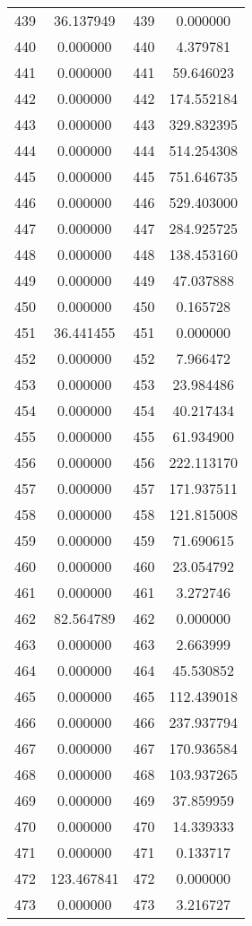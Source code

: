 \documentclass[12pt]{article}
\begin{document}
\begin{longtable}{@{}cccc@{}}
439 & 36.137949 & 439 & 0.000000 \\
440 & 0.000000 & 440 & 4.379781 \\
441 & 0.000000 & 441 & 59.646023 \\
442 & 0.000000 & 442 & 174.552184 \\
443 & 0.000000 & 443 & 329.832395 \\
444 & 0.000000 & 444 & 514.254308 \\
445 & 0.000000 & 445 & 751.646735 \\
446 & 0.000000 & 446 & 529.403000 \\
447 & 0.000000 & 447 & 284.925725 \\
448 & 0.000000 & 448 & 138.453160 \\
449 & 0.000000 & 449 & 47.037888 \\
450 & 0.000000 & 450 & 0.165728 \\
451 & 36.441455 & 451 & 0.000000 \\
452 & 0.000000 & 452 & 7.966472 \\
453 & 0.000000 & 453 & 23.984486 \\
454 & 0.000000 & 454 & 40.217434 \\
455 & 0.000000 & 455 & 61.934900 \\
456 & 0.000000 & 456 & 222.113170 \\
457 & 0.000000 & 457 & 171.937511 \\
458 & 0.000000 & 458 & 121.815008 \\
459 & 0.000000 & 459 & 71.690615 \\
460 & 0.000000 & 460 & 23.054792 \\
461 & 0.000000 & 461 & 3.272746 \\
462 & 82.564789 & 462 & 0.000000 \\
463 & 0.000000 & 463 & 2.663999 \\
464 & 0.000000 & 464 & 45.530852 \\
465 & 0.000000 & 465 & 112.439018 \\
466 & 0.000000 & 466 & 237.937794 \\
467 & 0.000000 & 467 & 170.936584 \\
468 & 0.000000 & 468 & 103.937265 \\
469 & 0.000000 & 469 & 37.859959 \\
470 & 0.000000 & 470 & 14.339333 \\
471 & 0.000000 & 471 & 0.133717 \\
472 & 123.467841 & 472 & 0.000000 \\
473 & 0.000000 & 473 & 3.216727 \\

\end{longtable}
\end{document}
